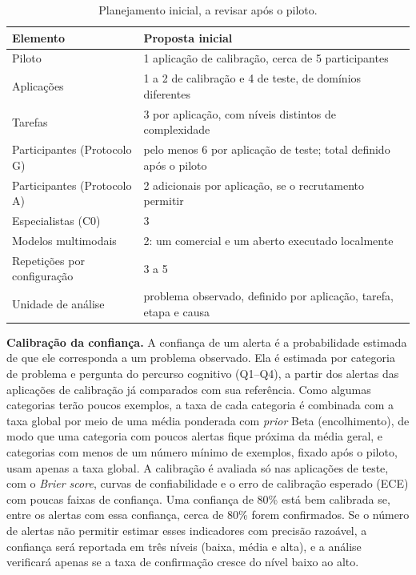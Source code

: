 \documentclass[12pt]{article}
\begin{document}
\begin{table}[!ht]
\centering
\caption{Planejamento inicial, a revisar após o piloto.}
\label{tab:escopo}
\small
\begin{tabularx}{0.9\linewidth}{@{}l Y@{}}
\toprule
\textbf{Elemento} & \textbf{Proposta inicial} \\
\midrule
Piloto & 1 aplicação de calibração, cerca de 5 participantes \\
Aplicações & 1 a 2 de calibração e 4 de teste, de domínios diferentes \\
Tarefas & 3 por aplicação, com níveis distintos de complexidade \\
Participantes (Protocolo G) & pelo menos 6 por aplicação de teste; total definido após o piloto \\
Participantes (Protocolo A) & 2 adicionais por aplicação, se o recrutamento permitir \\
Especialistas (C0) & 3 \\
Modelos multimodais & 2: um comercial e um aberto executado localmente \\
Repetições por configuração & 3 a 5 \\
Unidade de análise & problema observado, definido por aplicação, tarefa, etapa e causa \\
\bottomrule
\end{tabularx}
\end{table}

\textbf{Calibração da confiança.} A confiança de um alerta é a probabilidade estimada de que ele corresponda a um problema observado. Ela é estimada por categoria de problema e pergunta do percurso cognitivo (Q1--Q4), a partir dos alertas das aplicações de calibração já comparados com sua referência. Como algumas categorias terão poucos exemplos, a taxa de cada categoria é combinada com a taxa global por meio de uma média ponderada com \textit{prior} Beta (encolhimento), de modo que uma categoria com poucos alertas fique próxima da média geral, e categorias com menos de um número mínimo de exemplos, fixado após o piloto, usam apenas a taxa global. A calibração é avaliada só nas aplicações de teste, com o \textit{Brier score}, curvas de confiabilidade e o erro de calibração esperado (ECE) com poucas faixas de confiança. Uma confiança de 80\% está bem calibrada se, entre os alertas com essa confiança, cerca de 80\% forem confirmados. Se o número de alertas não permitir estimar esses indicadores com precisão razoável, a confiança será reportada em três níveis (baixa, média e alta), e a análise verificará apenas se a taxa de confirmação cresce do nível baixo ao alto.
\end{document}

